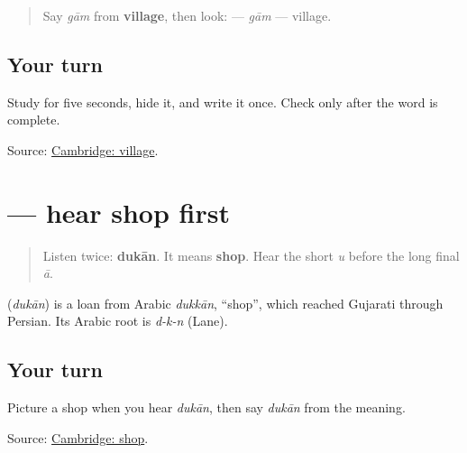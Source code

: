 \label{lesson:GU-C23-gaam}



\begin{quote}
Say \emph{gām} from \textbf{village}, then look: \textbf{} — \emph{gām} — village.
\end{quote}

\subsection*{Your turn}

Study \textbf{} for five seconds, hide it, and write it once. Check only after the word is complete.

\begin{tcolorbox}[breakable,colback=teal!4,colframe=teal!35!black,title={Before you move on}]
Source: \href{https://dictionary.cambridge.org/dictionary/english-gujarati/village}{Cambridge: village}.
\end{tcolorbox}
\section[\texorpdfstring{\gu{દુકાન} (dukān)}{દુકાન (dukān)}]{ — hear shop first}

\label{lesson:GU-C23-hear-dukaan}



\begin{quote}
Listen twice: \textbf{dukān}. It means \textbf{shop}. Hear the short \emph{u} before the long final \emph{ā}.
\end{quote}

\begin{cousinweb}
\textbf{} (\emph{dukān}) is a loan from Arabic \emph{dukkān}, \textquotedblleft{}shop\textquotedblright{}, which reached Gujarati through Persian. Its Arabic root is \emph{d-k-n} (Lane).
\end{cousinweb}

\subsection*{Your turn}
Picture a shop when you hear \emph{dukān}, then say \emph{dukān} from the meaning.

\begin{tcolorbox}[breakable,colback=teal!4,colframe=teal!35!black,title={Before you move on}]
Source: \href{https://dictionary.cambridge.org/dictionary/english-gujarati/shop}{Cambridge: shop}.
\end{tcolorbox}
